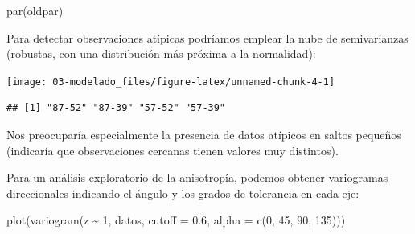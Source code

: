 \documentclass[
  spanish,
]{book}
\newenvironment{Shaded}{\begin{snugshade}}{\end{snugshade}}
\newcommand{\AttributeTok}[1]{\textcolor[rgb]{0.77,0.63,0.00}{#1}}
\newcommand{\DecValTok}[1]{\textcolor[rgb]{0.00,0.00,0.81}{#1}}
\newcommand{\FloatTok}[1]{\textcolor[rgb]{0.00,0.00,0.81}{#1}}
\newcommand{\FunctionTok}[1]{\textcolor[rgb]{0.00,0.00,0.00}{#1}}
\newcommand{\NormalTok}[1]{#1}
\newcommand{\OtherTok}[1]{\textcolor[rgb]{0.56,0.35,0.01}{#1}}
\newcommand{\SpecialCharTok}[1]{\textcolor[rgb]{0.00,0.00,0.00}{#1}}
\newcommand{\StringTok}[1]{\textcolor[rgb]{0.31,0.60,0.02}{#1}}
\theoremstyle{break}
\theoremstyle{definition}
\theoremstyle{definition}
\theoremstyle{definition}
\theoremstyle{definition}
\theoremstyle{remark}
\begin{document}
\begin{Shaded}
\begin{Highlighting}[]
\FunctionTok{par}\NormalTok{(oldpar)}
\end{Highlighting}
\end{Shaded}

Para detectar observaciones atípicas podríamos emplear la nube de semivarianzas (robustas, con una distribución más próxima a la normalidad):

\begin{Shaded}
\end{Shaded}

\begin{center}\texttt{[image: 03-modelado\_files/figure-latex/unnamed-chunk-4-1]} \end{center}

\begin{verbatim}
## [1] "87-52" "87-39" "57-52" "57-39"
\end{verbatim}

Nos preocuparía especialmente la presencia de datos atípicos en saltos pequeños (indicaría que observaciones cercanas tienen valores muy distintos).

Para un análisis exploratorio de la anisotropía, podemos obtener variogramas direccionales indicando el ángulo y los grados de tolerancia en cada eje:

\begin{Shaded}
\begin{Highlighting}[]
\FunctionTok{plot}\NormalTok{(}\FunctionTok{variogram}\NormalTok{(z }\SpecialCharTok{\textasciitilde{}} \DecValTok{1}\NormalTok{, datos, }\AttributeTok{cutoff =} \FloatTok{0.6}\NormalTok{, }\AttributeTok{alpha =} \FunctionTok{c}\NormalTok{(}\DecValTok{0}\NormalTok{, }\DecValTok{45}\NormalTok{, }\DecValTok{90}\NormalTok{, }\DecValTok{135}\NormalTok{)))}
\end{Highlighting}
\end{Shaded}
\end{document}
